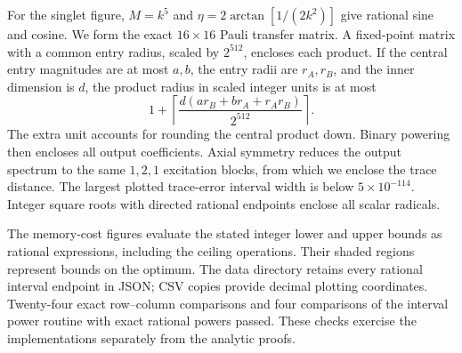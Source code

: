 For the singlet figure, $M=k^5$ and $\eta=2\arctan[1/(2k^2)]$ give rational sine and cosine. We form the exact $16\times16$ Pauli transfer matrix. A fixed-point matrix with a common entry radius, scaled by $2^{512}$, encloses each product. If the central entry magnitudes are at most $a,b$, the entry radii are $r_A,r_B$, and the inner dimension is $d$, the product radius in scaled integer units is at most
\[
 1+\left\lceil\frac{d(ar_B+br_A+r_Ar_B)}{2^{512}}\right\rceil.
\]
The extra unit accounts for rounding the central product down. Binary powering then encloses all output coefficients. Axial symmetry reduces the output spectrum to the same $1,2,1$ excitation blocks, from which we enclose the trace distance. The largest plotted trace-error interval width is below $5\times10^{-114}$. Integer square roots with directed rational endpoints enclose all scalar radicals.

The memory-cost figures evaluate the stated integer lower and upper bounds as rational expressions, including the ceiling operations. Their shaded regions represent bounds on the optimum. The data directory retains every rational interval endpoint in JSON; CSV copies provide decimal plotting coordinates. Twenty-four exact row--column comparisons and four comparisons of the interval power routine with exact rational powers passed. These checks exercise the implementations separately from the analytic proofs.
